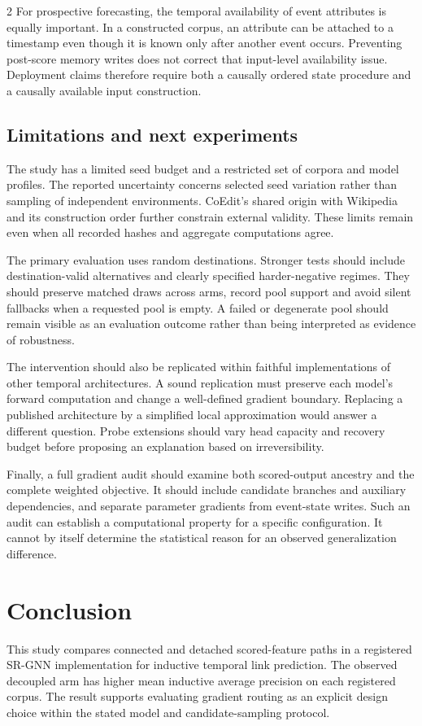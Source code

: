 \documentclass[a4paper,10pt]{article}
\begin{document}
\begin{multicols}{2}
For prospective forecasting, the temporal availability of event attributes is equally important. In a constructed corpus, an attribute can be attached to a timestamp even though it is known only after another event occurs. Preventing post-score memory writes does not correct that input-level availability issue. Deployment claims therefore require both a causally ordered state procedure and a causally available input construction.

\subsection{Limitations and next experiments}
The study has a limited seed budget and a restricted set of corpora and model profiles. The reported uncertainty concerns selected seed variation rather than sampling of independent environments. CoEdit's shared origin with Wikipedia and its construction order further constrain external validity. These limits remain even when all recorded hashes and aggregate computations agree.

The primary evaluation uses random destinations. Stronger tests should include destination-valid alternatives and clearly specified harder-negative regimes. They should preserve matched draws across arms, record pool support and avoid silent fallbacks when a requested pool is empty. A failed or degenerate pool should remain visible as an evaluation outcome rather than being interpreted as evidence of robustness.

The intervention should also be replicated within faithful implementations of other temporal architectures. A sound replication must preserve each model's forward computation and change a well-defined gradient boundary. Replacing a published architecture by a simplified local approximation would answer a different question. Probe extensions should vary head capacity and recovery budget before proposing an explanation based on irreversibility.

Finally, a full gradient audit should examine both scored-output ancestry and the complete weighted objective. It should include candidate branches and auxiliary dependencies, and separate parameter gradients from event-state writes. Such an audit can establish a computational property for a specific configuration. It cannot by itself determine the statistical reason for an observed generalization difference.

\section{Conclusion}
This study compares connected and detached scored-feature paths in a registered SR-GNN implementation for inductive temporal link prediction. The observed decoupled arm has higher mean inductive average precision on each registered corpus. The result supports evaluating gradient routing as an explicit design choice within the stated model and candidate-sampling protocol.


\end{multicols}
\end{document}
